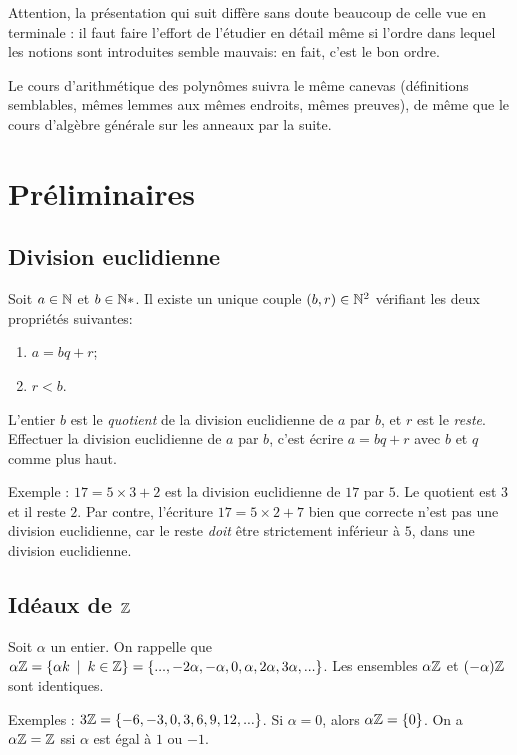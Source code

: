 
Attention, la présentation qui suit diffère sans doute beaucoup de celle vue en terminale : il faut faire l'effort de l'étudier en détail même si l'ordre dans lequel les notions sont introduites semble \og mauvais\fg : en fait, c'est le \og bon\fg{}  ordre.

Le cours d'arithmétique des polynômes suivra le même canevas (définitions semblables, mêmes lemmes aux mêmes endroits, mêmes preuves), de même que le cours d'algèbre générale sur les anneaux par la suite.

\section{Préliminaires}

\subsection{Division euclidienne}
\begin{proposition}
Soit $a\in \mathbb{N}$ et $b\in \mathbb{N}*$. Il existe un unique couple $(b,r) \in \mathbb{N}^2$ vérifiant les deux propriétés suivantes:
\begin{enumerate}
\item $a=bq+r$;
\item $r < b$.
\end{enumerate}
L'entier $b$ est le \emph{quotient} de la division euclidienne de $a$ par $b$, et $r$ est le \emph{reste}.
Effectuer la division euclidienne de $a$ par $b$, c'est écrire $a = bq+r$ avec $b$ et $q$ comme plus haut.
\end{proposition}

Exemple : $17=5\times 3 + 2$ est la division euclidienne de $17$ par $5$. Le quotient est $3$ et il reste $2$. Par contre, l'écriture $17=5\times 2+7$ bien que correcte  n'est pas une division euclidienne, car le reste \emph{doit} être strictement inférieur à $5$, dans une division euclidienne.

\subsection{Idéaux de $\mathbb{Z}$}

Soit $\alpha$ un entier. On rappelle que $\alpha\mathbb{Z} = \{ \alpha k\:\mid\: k\in \mathbb{Z}\} = \{..., -2\alpha, -\alpha, 0, \alpha, 2\alpha, 3\alpha, ...\}$. Les ensembles $\alpha\mathbb{Z}$ et $(-\alpha)\mathbb{Z}$ sont identiques.

Exemples : $3\mathbb{Z} = \{-6,-3,0,3,6,9,12,...\}$. Si $\alpha=0$, alors $\alpha\mathbb{Z} = \{0\}$. On a $\alpha\mathbb{Z} = \mathbb{Z}$ ssi $\alpha$ est égal à $1$ ou $-1$.

